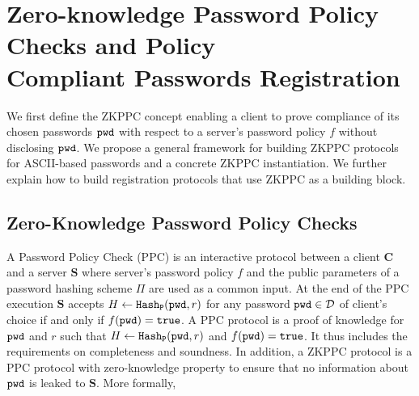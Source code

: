 \section{Zero-knowledge Password Policy Checks and Policy\\ Compliant Passwords Registration} \label{sec:vpake-registration}




We first define the ZKPPC concept enabling a client to prove compliance of its chosen passwords $\mathtt{pwd}$ with respect to a server's password policy $f$ without disclosing $\mathtt{pwd}$. We propose a general framework for building ZKPPC protocols for ASCII-based passwords and a concrete ZKPPC instantiation. We further explain how to build registration protocols that use ZKPPC as a building block.

\subsection{Zero-Knowledge Password Policy Checks}
A Password Policy Check (PPC) is an interactive protocol between a client $\bm{C}$ and a server $\bm{S}$ where server's password policy $f$ and the public parameters of a password hashing scheme $\Pi$ are used as a common input. At the end of the PPC execution $\bm{S}$ accepts $H\gets \mathtt{Hash_P}(\mathtt{pwd},r)$ for any password $\mathtt{pwd}\in\mathcal{D}$ of client's choice if and only if $f(\mathtt{pwd})=\mathtt{true}$. A PPC protocol is a proof of knowledge for $\mathtt{pwd}$ and $r$ such that $H\gets \mathtt{Hash_P}(\mathtt{pwd},r)$ and $f(\mathtt{pwd})=\mathtt{true}$. It thus includes the requirements on completeness and soundness. In addition, a ZKPPC protocol is a PPC protocol with zero-knowledge property to ensure that no information about $\mathtt{pwd}$ is leaked to $\bm{S}$. More formally, %

